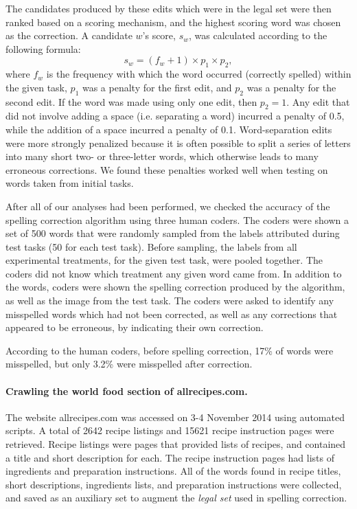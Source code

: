 \documentclass[12pt]{article}
\begin{document}
	The candidates produced by these edits which were in the legal set were
	then ranked based on a scoring mechanism, and the highest scoring word
	was chosen as the correction.  A candidate $w$'s score, $s_w$, was 
	calculated according to the following formula:
	\begin{equation}
		s_w = (f_w + 1) \times p_1 \times p_2,
	\end{equation}
	where $f_w$ is the frequency with which the word occurred (correctly 
	spelled)
	within the given task, $p_1$ was a penalty for the first edit, and
	$p_2$ was a penalty for the second edit.  If the word was made using only
	one edit, then $p_2 = 1$.  Any edit that did not involve adding a space
	(i.e. separating a word) incurred a penalty of 0.5, while the addition of
	a space incurred a penalty of 0.1.  Word-separation edits were more 
	strongly penalized because it is often possible to split a series of 
	letters into many short two- or three-letter words, which otherwise leads 
	to many erroneous corrections.  We found these penalties worked well when
	testing on words taken from initial tasks.

	After all of our analyses had been performed, we checked the accuracy of 
	the spelling correction algorithm using three human coders.  The coders
	were shown a set of 
	500 words that were randomly sampled from the labels attributed during 
	test tasks (50 for each test task).  Before sampling, the labels from all
	experimental treatments, for the given test task, were pooled together.
	The coders did not know which treatment any given word came from.  
	In addition to the words, coders were shown the spelling correction 
	produced by the algorithm, as well as the image from the test task.
	The coders were asked to identify any misspelled words which had not 
	been corrected, as well as any corrections that appeared to be erroneous,
	by indicating their own correction.

	According to the human coders, before spelling correction, 17\% of words 
	were misspelled, but only 3.2\% were misspelled after correction.

	\paragraph{Crawling the world food section of allrecipes.com.}
	The website allrecipes.com was accessed on 3-4 November 2014 using 
	automated scripts.  A total of 2642 recipe listings and 15621 recipe
	instruction pages were retrieved.  Recipe listings were pages that 
	provided lists of recipes, and contained a title and short description 
	for each.  
	The recipe instruction pages had lists of ingredients and preparation 
	instructions.  All of the words found in recipe titles, short
	descriptions, ingredients lists, and preparation instructions were
	collected, and saved as an auxiliary set to augment the \textit{legal set}
	used in spelling correction.
	
\end{document}
